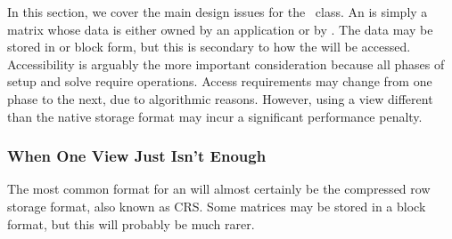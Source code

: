 In this section, we cover the main design issues for the \muemat\ \operator class.
An \operator is simply a matrix whose data is either owned by an application or by \muemat.
The data may be stored in \point or block form, but this is secondary to how the \operator will be accessed.
Accessibility is arguably the more important consideration because all phases of setup and solve require
\operator operations. Access requirements may change from one phase to the next, due to algorithmic
reasons.  However, using a view different than the native storage format  may incur a significant performance penalty.

\subsubsection{When One View Just Isn't Enough}
The most common format for an \operator will almost certainly be the \point compressed row storage format, also known as
CRS.
Some matrices may be stored in a block format, but this will probably be much rarer.

